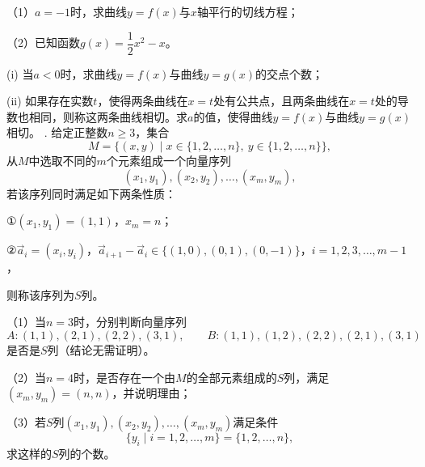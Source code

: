 \noindent（1）$a=-1$时，求曲线$y=f(x)$与$x$轴平行的切线方程；

\noindent（2）已知函数$g(x)=\dfrac12x^2-x$。

\noindent\quad (i) 当$a<0$时，求曲线$y=f(x)$与曲线$y=g(x)$的交点个数；

\noindent\quad (ii) 如果存在实数$t$，使得两条曲线在$x=t$处有公共点，且两条曲线在$x=t$处的导数也相同，则称这两条曲线相切。求$a$的值，使得曲线$y=f(x)$与曲线$y=g(x)$相切。
\newpage
{}. 给定正整数$n\geqslant3$，集合
\[
M=\{(x,y)\mid x\in\{1,2,\ldots,n\},\ y\in\{1,2,\ldots,n\}\},
\]
从$M$中选取不同的$m$个元素组成一个向量序列
\[
(x_1,y_1),(x_2,y_2),\ldots,(x_m,y_m),
\]
若该序列同时满足如下两条性质：

\noindent ①$(x_1,y_1)=(1,1)$，$x_m=n$；

\noindent ②$\vec a_i=(x_i,y_i)$，$\vec a_{i+1}-\vec a_i\in\{(1,0),(0,1),(0,-1)\}$，$i=1,2,3,\ldots,m-1$，

\noindent 则称该序列为$S$列。

\noindent（1）当$n=3$时，分别判断向量序列
\[
A:(1,1),(2,1),(2,2),(3,1),\qquad
B:(1,1),(1,2),(2,2),(2,1),(3,1)
\]
是否是$S$列（结论无需证明）。

\noindent（2）当$n=4$时，是否存在一个由$M$的全部元素组成的$S$列，满足$(x_m,y_m)=(n,n)$，并说明理由；

\noindent（3）若$S$列$(x_1,y_1),(x_2,y_2),\ldots,(x_m,y_m)$满足条件
\[
\{y_i\mid i=1,2,\ldots,m\}=\{1,2,\ldots,n\},
\]
求这样的$S$列的个数。
